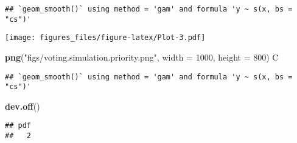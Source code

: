 \documentclass[]{article}
\newenvironment{Shaded}{\begin{snugshade}}{\end{snugshade}}
\newcommand{\DataTypeTok}[1]{\textcolor[rgb]{0.13,0.29,0.53}{#1}}
\newcommand{\DecValTok}[1]{\textcolor[rgb]{0.00,0.00,0.81}{#1}}
\newcommand{\KeywordTok}[1]{\textcolor[rgb]{0.13,0.29,0.53}{\textbf{#1}}}
\newcommand{\NormalTok}[1]{#1}
\newcommand{\StringTok}[1]{\textcolor[rgb]{0.31,0.60,0.02}{#1}}
\begin{document}
\begin{verbatim}
## `geom_smooth()` using method = 'gam' and formula 'y ~ s(x, bs = "cs")'
\end{verbatim}

\texttt{[image: figures\_files/figure-latex/Plot-3.pdf]}

\begin{Shaded}
\begin{Highlighting}[]
\KeywordTok{png}\NormalTok{(}\StringTok{"figs/voting.simulation.priority.png"}\NormalTok{, }\DataTypeTok{width =} \DecValTok{1000}\NormalTok{, }\DataTypeTok{height =} \DecValTok{800}\NormalTok{)}
\NormalTok{C}
\end{Highlighting}
\end{Shaded}

\begin{verbatim}
## `geom_smooth()` using method = 'gam' and formula 'y ~ s(x, bs = "cs")'
\end{verbatim}

\begin{Shaded}
\begin{Highlighting}[]
\KeywordTok{dev.off}\NormalTok{()}
\end{Highlighting}
\end{Shaded}

\begin{verbatim}
## pdf 
##   2
\end{verbatim}
\end{document}
